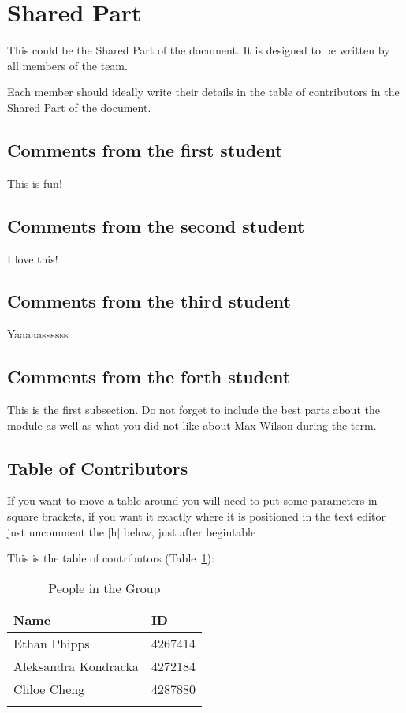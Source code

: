 \section{Shared Part}

This could be the Shared Part of the document. It is designed to be written by all members of the team.

Each member should ideally write their details in the table of contributors in the Shared Part of the document.

\subsection{Comments from the first student}
This is fun!

\subsection{Comments from the second student}
I love this!

\subsection{Comments from the third student}
Yaaaaassssss

\subsection{Comments from the forth student}
This is the first subsection. Do not forget to include the best parts about the module as well as what you did not like about Max Wilson during the term.

\subsection{Table of Contributors}


If you want to move a table around you will need to put some parameters in square brackets, if you want it exactly where it is positioned in the text editor just uncomment the [h] below, just after begin{table}

This is the table of contributors (Table~\ref{authors}):
\begin{table}%
\centering
\caption{People in the Group}
\label{authors}
\begin{tabular}{|l|l|}
\hline
\textbf{Name} & \textbf{ID} \\
\hline
Ethan Phipps & 4267414\\
\hline
Aleksandra Kondracka & 4272184\\
\hline
Chloe Cheng & 4287880 \\
\hline
& \\
\hline
\end{tabular}
\end{table}